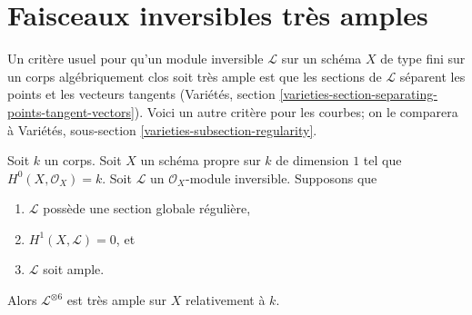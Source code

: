 \section{Faisceaux inversibles très amples}
\label{section-very-ample}

\noindent
Un critère usuel pour qu'un module inversible $\mathcal{L}$ sur un schéma $X$ de type fini sur un corps algébriquement clos soit très ample est que les sections de $\mathcal{L}$ séparent les points et les vecteurs tangents (Variétés, section \ref{varieties-section-separating-points-tangent-vectors}). Voici un autre critère pour les courbes; on le comparera à Variétés, sous-section \ref{varieties-subsection-regularity}.

\begin{lemma}
\label{lemma-criterion-very-ample}
Soit $k$ un corps. Soit $X$ un schéma propre sur $k$ de dimension $1$ tel que $H^0(X, \mathcal{O}_X) = k$. Soit $\mathcal{L}$ un $\mathcal{O}_X$-module inversible. Supposons que \begin{enumerate} \item $\mathcal{L}$ possède une section globale régulière, \item $H^1(X, \mathcal{L}) = 0$, et \item $\mathcal{L}$ soit ample. \end{enumerate} Alors $\mathcal{L}^{\otimes 6}$ est très ample sur $X$ relativement à $k$.
\end{lemma}

